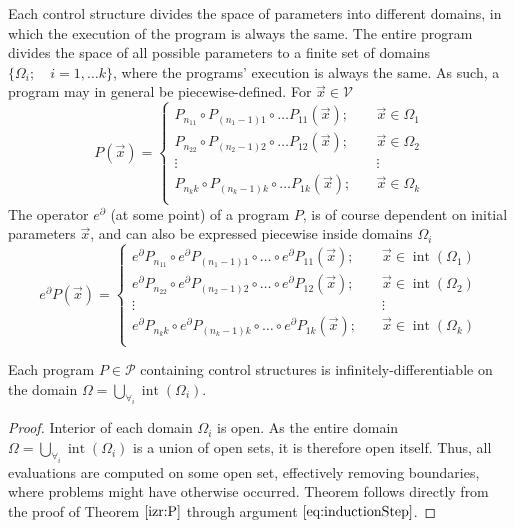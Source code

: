 \documentclass[smallcondensed]{svjour3}
\newcommand{\VV}{\mathcal{V}}
\newcommand{\dP}{\mathcal{P}}
\newcommand{\D}{\partial}
\DeclareMathOperator{\interior}{int}
\begin{document}
 Each control structure divides the space of parameters into different domains, in which the execution of the program is always the same. The entire program divides the space of all possible parameters to a finite set of domains $\{\Omega_i;\quad i=1,\ldots
  k\}$, where the programs' execution is always the same. As such, a program may in general be piecewise-defined. For $\vec{x}\in\VV$
 \begin{equation}
   \label{eq:zlrprk_splosno}
   P(\vec{x}) =
   \begin{cases}
     P_{n_11}\circ P_{(n_1-1)1}\circ\ldots P_{11}(\vec{x});&\quad \vec{x}\in\Omega_1\\
     P_{n_22}\circ P_{(n_2-1)2}\circ\ldots P_{12}(\vec{x});&\quad \vec{x}\in\Omega_2\\
     \vdots&\quad\vdots\\
     P_{n_kk}\circ P_{(n_k-1)k}\circ\ldots P_{1k}(\vec{x});&\quad \vec{x}\in\Omega_k\\
   \end{cases}
 \end{equation}
 The operator $e^\D$ (at some point) of a program $P$, is of course dependent on initial parameters $\vec{x}$, and can also be expressed piecewise inside domains $\Omega_i$
 \begin{equation}
   \label{eq:Dzlrprk_splosno}
   e^\D P({\vec{x}}) =
   \begin{cases}
     e^\D P_{n_11}\circ e^\D P_{(n_1-1)1}\circ\ldots\circ e^\D P_{11}(\vec{x});&\quad \vec{x}\in\interior(\Omega_1)\\
     e^\D P_{n_22}\circ e^\D P_{(n_2-1)2}\circ\ldots\circ e^\D P_{12}(\vec{x});&\quad \vec{x}\in\interior(\Omega_2)\\
     \vdots&\quad\vdots\\
     e^\D P_{n_kk}\circ e^\D P_{(n_k-1)k}\circ\ldots\circ e^\D P_{1k}(\vec{x});&\quad \vec{x}\in\interior(\Omega_k)\\
   \end{cases}
 \end{equation}

 \begin{theorem}\label{izr:diferentiableOnDomain}
 Each program $P\in\dP$ containing control structures is infinitely-differentiable on the domain $\Omega=\bigcup\limits_{\forall_i}\interior(\Omega_i)$.
 \end{theorem}
 \begin{proof}
  Interior of each domain $\Omega_i$ is open. As the entire domain $\Omega=\bigcup\limits_{\forall_i}\interior(\Omega_i)$ is a union of open sets, it is therefore open itself. Thus, all evaluations are computed on some open set, effectively removing boundaries, where problems might have otherwise occurred. Theorem follows directly from the proof of Theorem $\ref{izr:P}$ through argument $\eqref{eq:inductionStep}$.
 \end{proof}
 
\end{document}

